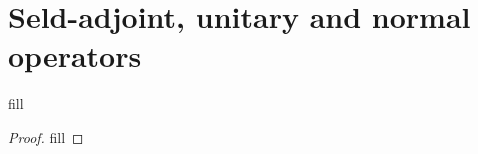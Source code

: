 \section{Seld-adjoint, unitary and normal operators}

\begin{exercise}{1}
fill
\end{exercise}
\begin{proof}
fill
\end{proof}